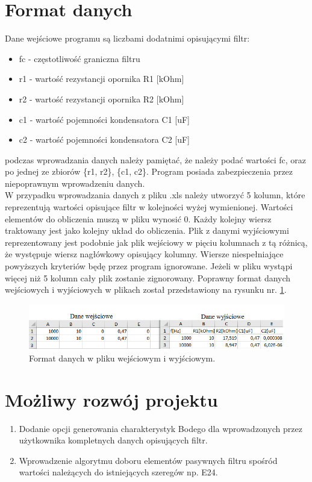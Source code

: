 \documentclass[a4paper,12pt]{article}
\begin{document}
\section{Format danych}
	\label{sec:format}

	Dane wejściowe programu są liczbami dodatnimi opisującymi filtr:
	\begin{itemize}
				\item fc - częstotliwość graniczna filtru
				\item r1 - wartość rezystancji opornika R1 [kOhm]
				\item r2 - wartość rezystancji opornika R2 [kOhm]
				\item c1 - wartość pojemności kondensatora C1 [uF]
				\item c2 - wartość pojemności kondensatora C2 [uF]
	\end{itemize}
	
	podczas wprowadzania danych należy pamiętać, że należy podać wartości 
	fc, oraz po jednej ze zbiorów \{r1, r2\}, \{c1, c2\}. Program posiada zabezpieczenia
	przez niepoprawnym wprowadzeniu danych.  \\
	W przypadku wprowadzania danych z pliku .xls należy utworzyć 5 kolumn, które 
	reprezentują wartości opisujące filtr w kolejności wyżej wymienionej.
	Wartości elementów do obliczenia muszą w pliku wynosić 0.
	Każdy kolejny wiersz traktowany jest jako kolejny układ do obliczenia.
	Plik z danymi wyjściowymi reprezentowany jest podobnie jak plik wejściowy
	 w pięciu kolumnach
	 z tą różnicą, że występuje wiersz nagłówkowy opisujący kolumny.
	 Wiersze niespełniające powyższych kryteriów będę przez program ignorowane.
	 Jeżeli w pliku wystąpi więcej niż 5 kolumn cały plik zostanie zignorowany.
	 Poprawny format danych wejściowych i wyjściowych w plikach został przedstawiony
	 na rysunku nr. \ref{fig:plik}.
	 
	 		\begin{figure}[!htbp]
 				\centering
					 \includegraphics[width=\textwidth]{../Pictures/plik.png}
 					 \caption{Format danych w pliku wejściowym i wyjściowym.}
					 \label{fig:plik}
			\end{figure}

\section{Możliwy rozwój projektu}

	\begin{enumerate}
		\item Dodanie opcji generowania charakterystyk Bodego dla wprowadzonych przez 
		użytkownika kompletnych danych opisujących filtr.
		\item Wprowadzenie algorytmu doboru elementów pasywnych filtru spośród wartości 
		należących do istniejących szeregów np. E24.
	\end{enumerate}
\end{document}
